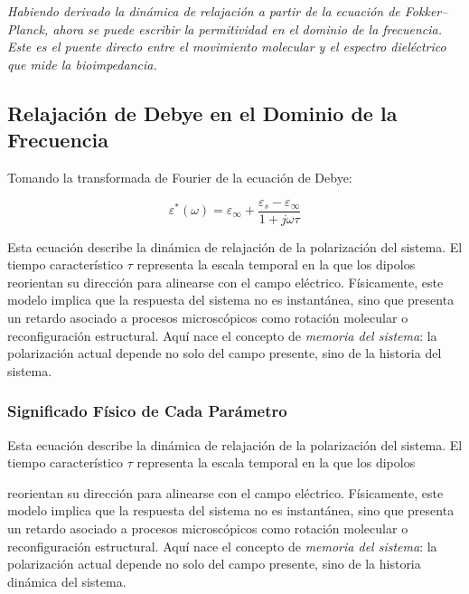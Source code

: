 \documentclass[12pt]{article}
\begin{document}

\noindent\textit{Habiendo derivado la din\'amica de relajaci\'on a partir de la ecuaci\'on de
Fokker--Planck, ahora se puede escribir la permitividad en el dominio de la frecuencia. Este es el
puente directo entre el movimiento molecular y el espectro diel\'ectrico que mide la
bioimpedancia.}

\subsection{Relajaci\'on de Debye en el Dominio de la Frecuencia}
Tomando la transformada de Fourier de la ecuaci\'on de Debye:

\begin{equation}
\boxed{
\varepsilon^*(\omega) =
\varepsilon_\infty +
\frac{\varepsilon_s - \varepsilon_\infty}{1 + j\omega\tau}
}
\label{eq:debye}
\end{equation}

Esta ecuaci\'on describe la din\'amica de relajaci\'on de la polarizaci\'on
del sistema. El tiempo caracter\'istico $\tau$ representa la escala temporal en
la que los dipolos reorientan su direcci\'on para alinearse con el campo el\'ectrico.
F\'isicamente, este modelo implica que la respuesta del sistema no es instant\'anea,
sino que presenta un retardo asociado a procesos microsc\'opicos como rotaci\'on
molecular o reconfiguraci\'on estructural. Aqu\'i nace el concepto de \emph{memoria
del sistema}: la polarizaci\'on actual depende no solo del campo presente, sino de
la historia del sistema.

\subsubsection{Significado F\'isico de Cada Par\'ametro}

Esta ecuaci\'on describe la din\'amica de relajaci\'on de la polarizaci\'on del sistema.
El tiempo caracter\'istico $\tau$ representa la escala temporal en la que los dipolos

reorientan su direcci\'on para alinearse con el campo el\'ectrico. F\'isicamente, este
modelo implica que la respuesta del sistema no es instant\'anea, sino que presenta un
retardo asociado a procesos microsc\'opicos como rotaci\'on molecular o reconfiguraci\'on
estructural. Aqu\'i nace el concepto de \emph{memoria del sistema}: la polarizaci\'on
actual depende no solo del campo presente, sino de la historia din\'amica del sistema.
\end{document}

